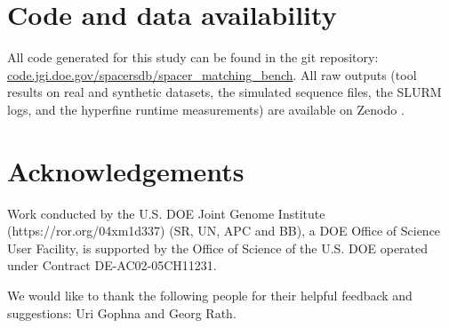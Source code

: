 \documentclass[
]{article}
\begin{document}
\section{Code and data availability}\label{code-and-data-availability}

All code generated for this study can be found in the git repository:
\href{http://code.jgi.doe.gov/spacersdb/spacer_matching_bench}{code.jgi.doe.gov/spacersdb/spacer\_matching\_bench}.
All raw outputs (tool results on real and synthetic datasets, the
simulated sequence files, the SLURM logs, and the hyperfine runtime
measurements) are available on Zenodo \autocite{zenodo_doi}.

\section{Acknowledgements}\label{acknowledgements}

Work conducted by the U.S. DOE Joint Genome Institute
(https://ror.org/04xm1d337) (SR, UN, APC and BB), a DOE Office of
Science User Facility, is supported by the Office of Science of the U.S.
DOE operated under Contract DE-AC02-05CH11231.

We would like to thank the following people for their helpful feedback
and suggestions: Uri Gophna and Georg Rath.


\printbibliography
\end{document}
